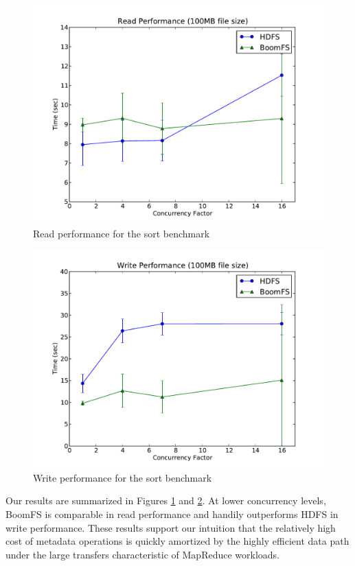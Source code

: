 \documentclass[twocolumn]{article}
\begin{document}
\begin{figure}
\centering
\includegraphics[width=1\columnwidth]{figures/big_read_throughput.pdf}
\caption{Read performance for the sort benchmark}
\label{fig:big-read-perf}
\end{figure}
\begin{figure}
\centering
\includegraphics[width=1\columnwidth]{figures/big_write_throughput.pdf}
\caption{Write performance for the sort benchmark}
\label{fig:big-write-perf}
\end{figure}
Our results are summarized in Figures \ref{fig:big-read-perf} and
\ref{fig:big-write-perf}.  At lower concurrency levels, BoomFS is
comparable in read performance and handily outperforms HDFS in write
performance.  These results support our intuition that the relatively
high cost of metadata operations is quickly amortized by the highly
efficient data path under the large transfers characteristic of
MapReduce workloads.
\end{document}
